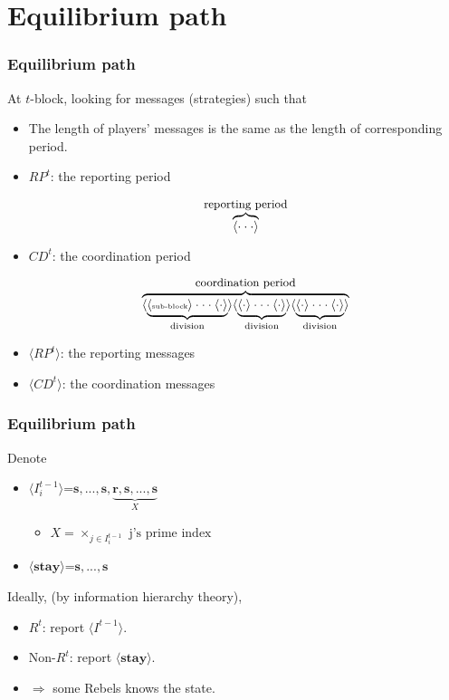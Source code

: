 \documentclass[10pt]{beamer}
\begin{document}
\section{Equilibrium path}
\begin{frame}
\frametitle{Equilibrium path}

At $t$-block, looking for messages (strategies) such that
\begin{itemize}
\item The length of players' messages is the same as the length of corresponding period.   
\item $RP^t$: the reporting period

\[\overbrace{\langle \cdot \cdot \cdot \rangle}^{\text{\small reporting period}}\] 

\item $CD^t$: the coordination period

\[\overbrace{\langle\underbrace{\langle \text{\tiny sub-block} \rangle \cdot \cdot \cdot \langle \cdot \rangle}_{\text{division}}\rangle \langle\underbrace{\langle \cdot \rangle \cdot \cdot \cdot \langle \cdot \rangle}_{\text{division}} \rangle \langle\underbrace{\langle \cdot \rangle \cdot \cdot \cdot \langle \cdot \rangle}_{\text{division}}\rangle}^{\text{\small coordination period}}\] 

\item $\langle RP^t \rangle$: the reporting messages
\item $\langle CD^t \rangle$: the coordination messages

\end{itemize}



\end{frame}


\begin{frame}
\frametitle{Equilibrium path}

Denote
\begin{itemize}
\item $\langle I^{t-1}_i\rangle$=$\textbf{s},...,\textbf{s},\underbrace{\textbf{r},\textbf{s},...,\textbf{s}}_{X}$
\begin{itemize}
\item $X=\times_{j\in I^{t-1}_i}\text{ j's prime index}$
\end{itemize}
\item $\langle \textbf{stay} \rangle$=$\textbf{s},...,\textbf{s}$
\end{itemize}

Ideally, (by information hierarchy theory),
\begin{itemize}
\item $R^t$: report $\langle I^{t-1} \rangle$.
\item Non-$R^t$: report $\langle \textbf{stay} \rangle$.
\item $\Rightarrow$ some Rebels knows the state.
\end{itemize}


\end{frame}
\end{document}
